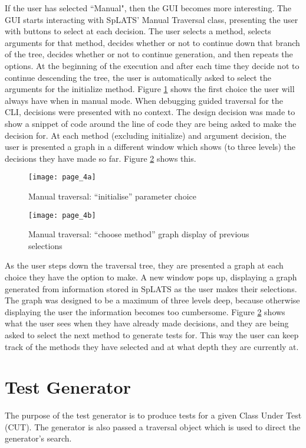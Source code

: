   If the user has selected ``Manual", then the GUI becomes more interesting. The GUI starts interacting with SpLATS' Manual Traversal class, presenting the user with buttons to select at each decision. The user selects a method, selects arguments for that method, decides whether or not to continue down that branch of the tree, decides whether or not to continue generation, and then repeats the options. At the beginning of the execution and after each time they decide not to continue descending the tree, the user is automatically asked to select the arguments for the initialize method. Figure \ref{fig:GUI_Page4a} shows the first choice the user will always have when in manual mode. When debugging guided traversal for the CLI, decisions were presented with no context. The design decision was made to show a snippet of code around the line of code they are being asked to make the decision for. At each method (excluding initialize) and argument decision, the user is presented a graph in a different window which shows (to three levels) the decisions they have made so far. Figure \ref{fig:GUI_Page4b} shows this.
  
  \begin{figure}
    \centering
    \texttt{[image: page\_4a]}
    \caption{Manual traversal: ``initialise'' parameter choice}
    \label{fig:GUI_Page4a}
  \end{figure}
  
  \begin{figure}
    \centering
    \texttt{[image: page\_4b]}
    \caption{Manual traversal: ``choose method'' graph display of previous selections}
    \label{fig:GUI_Page4b}
  \end{figure}
  
  As the user steps down the traversal tree, they are presented a graph at each choice they have the option to make. A new window pops up, displaying a graph generated from information stored in SpLATS as the user makes their selections. The graph was designed to be a maximum of three levels deep, because otherwise displaying the user the information becomes too cumbersome. Figure \ref{fig:GUI_Page4b} shows what the user sees when they have already made decisions, and they are being asked to select the next method to generate tests for. This way the user can keep track of the methods they have selected and at what depth they are currently at.

  \section{Test Generator}
    The purpose of the test generator is to produce tests for a given Class
Under Test (CUT). The generator is also passed a traversal object which is used
to direct the generator's search.

